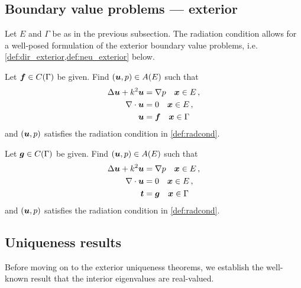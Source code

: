 \subsection{Boundary value problems --- exterior}

Let $E$ and $\Gamma$ be as in the previous subsection.
The radiation condition allows for a well-posed formulation
of the exterior boundary value problems, i.e.
\cref{def:dir_exterior,def:neu_exterior} below.

\begin{definition}
  \label{def:dir_exterior}
  Let ${\boldsymbol f} \in C(\Gamma)$ be given. Find $({\boldsymbol u},p) \in A(E)$
  such that
  \begin{equation}
  \begin{aligned} \label{eq:dir_exterior}
    \Delta {\boldsymbol u} + k^{2} {\boldsymbol u} &= \nabla p \quad {\boldsymbol x} \in E \, ,\\
    \nabla \cdot {\boldsymbol u} &= 0 \quad {\boldsymbol x} \in E \, ,  \\
    {\boldsymbol u} &= {\boldsymbol f} \quad {\boldsymbol x} \in \Gamma \, 
  \end{aligned}
  \end{equation}
  and $({\boldsymbol u},p)$ satisfies the radiation condition in
  \cref{def:radcond}.
\end{definition}
\begin{definition}
  \label{def:neu_exterior}  
  Let ${\boldsymbol g} \in C(\Gamma)$ be given. Find $({\boldsymbol u},p) \in A(E)$
  such that
  \begin{equation}
  \begin{aligned} \label{eq:neu_exterior}
    \Delta {\boldsymbol u} + k^{2} {\boldsymbol u} &= \nabla p \quad {\boldsymbol x} \in E \, ,\\
    \nabla \cdot {\boldsymbol u} &= 0 \quad {\boldsymbol x} \in E \, ,  \\
    {\boldsymbol t} &= {\boldsymbol g} \quad {\boldsymbol x} \in \Gamma \,
  \end{aligned}
  \end{equation}
  and $({\boldsymbol u},p)$ satisfies the radiation condition in
  \cref{def:radcond}.
\end{definition}



\subsection{Uniqueness results}

Before moving on to the exterior uniqueness theorems,
we establish the well-known result that
the interior eigenvalues are real-valued.

